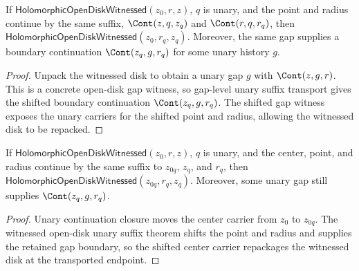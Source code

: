 \begin{theorem}
\label{thm:holomorphic-open-disk-witnessed-unary-suffix-transport}
If \(\mathsf{HolomorphicOpenDiskWitnessed}(z_0,r,z)\), \(q\) is unary, and
the point and radius continue by the same suffix,
\(\Cont(z,q,z_q)\) and \(\Cont(r,q,r_q)\), then
\(\mathsf{HolomorphicOpenDiskWitnessed}(z_0,r_q,z_q)\). Moreover, the same
gap supplies a boundary continuation \(\Cont(z_q,g,r_q)\) for some unary
history \(g\).
\end{theorem}
\begin{proof}
Unpack the witnessed disk to obtain a unary gap \(g\) with
\(\Cont(z,g,r)\). This is a concrete open-disk gap witness, so gap-level
unary suffix transport gives the shifted boundary continuation
\(\Cont(z_q,g,r_q)\). The shifted gap witness exposes the unary carriers for
the shifted point and radius, allowing the witnessed disk to be repacked.
\end{proof}

\begin{theorem}
\label{thm:holomorphic-open-disk-witnessed-center-point-unary-suffix-transport}
If \(\mathsf{HolomorphicOpenDiskWitnessed}(z_0,r,z)\), \(q\) is unary, and
the center, point, and radius continue by the same suffix to \(z_{0q}\),
\(z_q\), and \(r_q\), then
\(\mathsf{HolomorphicOpenDiskWitnessed}(z_{0q},r_q,z_q)\). Moreover, some
unary gap still supplies \(\Cont(z_q,g,r_q)\).
\end{theorem}
\begin{proof}
Unary continuation closure moves the center carrier from \(z_0\) to
\(z_{0q}\). The witnessed open-disk unary suffix theorem shifts the point and
radius and supplies the retained gap boundary, so the shifted center carrier
repackages the witnessed disk at the transported endpoint.
\end{proof}

